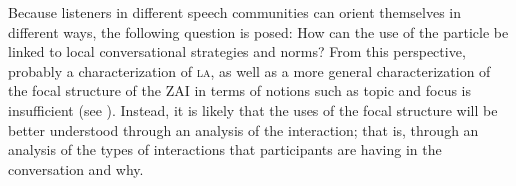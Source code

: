 Because listeners in different speech communities can orient themselves in different ways, the following question is posed: How can the use of the particle be linked to local conversational strategies and norms? From this perspective, probably a characterization of \textsc{la}, as well as a more general characterization of the focal structure of the ZAI in terms of notions such as topic and focus is insufficient (see \citealt{matic2013,ozerov2015}). Instead, it is likely that the uses of the focal structure will be better understood through an analysis of the interaction; that is, through an analysis of the types of interactions that participants are having in the conversation and why.













%
%
